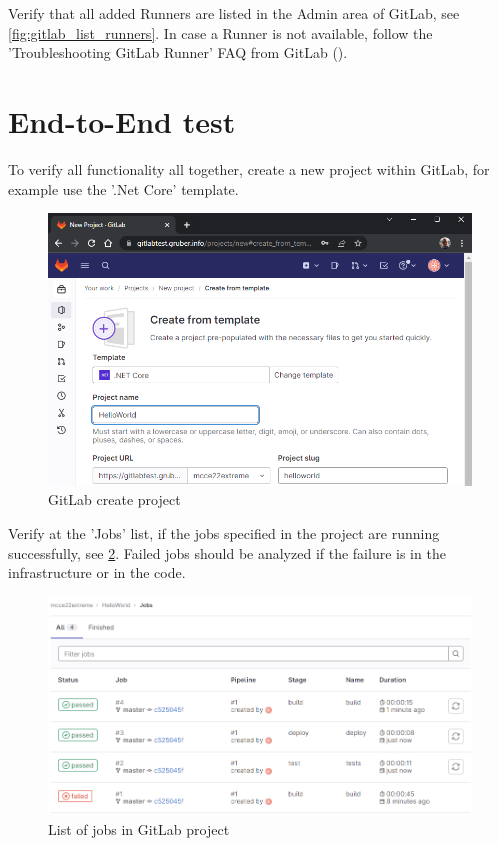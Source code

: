 Verify that all added Runners are listed in the Admin area of GitLab, see \ref{fig:gitlab_list_runners}.
In case a Runner is not available, follow the 'Troubleshooting GitLab Runner' FAQ from GitLab (\cite{refGitLabRunnersTroubleshooting}).

\section{End-to-End test}

To verify all functionality all together, create a new project within GitLab, for example use the '.Net Core' template.
\begin{figure}[H]
	\centering
	\includegraphics[width=14cm]{images/gitlab_create_project.png}
	\caption{GitLab create project}
	\label{fig:gitlab_create_project}
\end{figure}

Verify at the 'Jobs' list, if the jobs specified in the project are running successfully, see \ref{fig:gitlab_jobs_list}.
Failed jobs should be analyzed if the failure is in the infrastructure or in the code.
\begin{figure}[H]
	\centering
	\includegraphics[width=14cm]{images/gitlab_jobs_list.png}
	\caption{List of jobs in GitLab project}
	\label{fig:gitlab_jobs_list}
\end{figure}